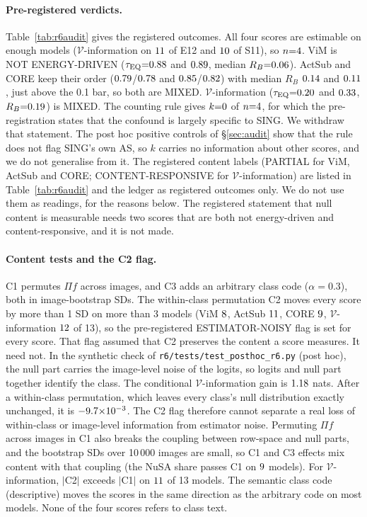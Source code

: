 \documentclass[10pt]{article}
\begin{document}
\paragraph{Pre-registered verdicts.} Table~\ref{tab:r6audit} gives the registered outcomes. All four scores are estimable on enough models ($\mathcal{V}$-information on $11$ of E12 and $10$ of S11), so $n{=}4$. ViM is NOT ENERGY-DRIVEN ($\tau_{\mathrm{EQ}}{=}0.88$ and $0.89$, median $R_B{=}0.06$). ActSub and CORE keep their order ($0.79$/$0.78$ and $0.85$/$0.82$) with median $R_B$ $0.14$ and $0.11$, just above the 0.1 bar, so both are MIXED. $\mathcal{V}$-information ($\tau_{\mathrm{EQ}}{=}0.20$ and $0.33$, $R_B{=}0.19$) is MIXED. The counting rule gives $k{=}0$ of $n{=}4$, for which the pre-registration states that the confound is largely specific to SING. We withdraw that statement. The post hoc positive controls of \S\ref{sec:audit} show that the rule does not flag SING's own AS, so $k$ carries no information about other scores, and we do not generalise from it. The registered content labels (PARTIAL for ViM, ActSub and CORE; CONTENT-RESPONSIVE for $\mathcal{V}$-information) are listed in Table~\ref{tab:r6audit} and the ledger as registered outcomes only. We do not use them as readings, for the reasons below. The registered statement that null content is measurable needs two scores that are both not energy-driven and content-responsive, and it is not made.

\paragraph{Content tests and the C2 flag.} C1 permutes $\Pi f$ across images, and C3 adds an arbitrary class code ($\alpha{=}0.3$), both in image-bootstrap SDs. The within-class permutation C2 moves every score by more than 1 SD on more than 3 models (ViM $8$, ActSub $11$, CORE $9$, $\mathcal{V}$-information $12$ of 13), so the pre-registered ESTIMATOR-NOISY flag is set for every score. That flag assumed that C2 preserves the content a score measures. It need not. In the synthetic check of \texttt{r6/tests/test\_posthoc\_r6.py} (post hoc), the null part carries the image-level noise of the logits, so logits and null part together identify the class. The conditional $\mathcal{V}$-information gain is $1.18$ nats. After a within-class permutation, which leaves every class's null distribution exactly unchanged, it is $-9.7{\times}10^{-3}$. The C2 flag therefore cannot separate a real loss of within-class or image-level information from estimator noise. Permuting $\Pi f$ across images in C1 also breaks the coupling between row-space and null parts, and the bootstrap SDs over 10\,000 images are small, so C1 and C3 effects mix content with that coupling (the NuSA share passes C1 on $9$ models). For $\mathcal{V}$-information, $|$C2$|$ exceeds $|$C1$|$ on $11$ of 13 models. The semantic class code (descriptive) moves the scores in the same direction as the arbitrary code on most models. None of the four scores refers to class text.
\end{document}
